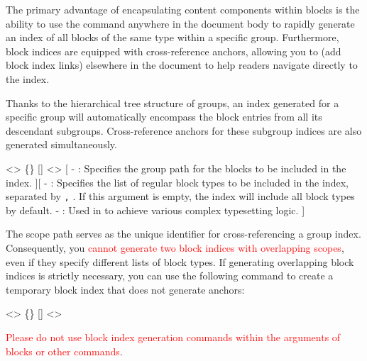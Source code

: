 
The primary advantage of encapsulating content components within blocks is the ability to use the  command anywhere in the document body to rapidly generate an index of all blocks of the same type within a specific group. Furthermore, block indices are equipped with cross-reference anchors, allowing you to (add block index links) elsewhere in the document to help readers navigate directly to the index.

Thanks to the hierarchical tree structure of groups, an index generated for a specific group will automatically encompass the block entries from all its descendant subgroups. Cross-reference anchors for these subgroup indices are also generated simultaneously.

<>{
    \{\}
    []
    <>
}[
    -  : Specifies the group path for the blocks to be included in the index.
][
    -  : Specifies the list of regular block types to be included in the index, separated by \texttt{,} . If this argument is empty, the index will include all block types by default.
    -  : Used in  to achieve various complex typesetting logic.
]

The scope path serves as the unique identifier for cross-referencing a group index. Consequently, you \textcolor{red}{cannot generate two block indices with overlapping scopes}, even if they specify different lists of block types. If generating overlapping block indices is strictly necessary, you can use the following command to create a temporary block index that does not generate anchors:

<>{
    \{\}
    []
    <>
}

\textcolor{red}{Please do not use block index generation commands within the arguments of blocks or other commands}.

\newpage
